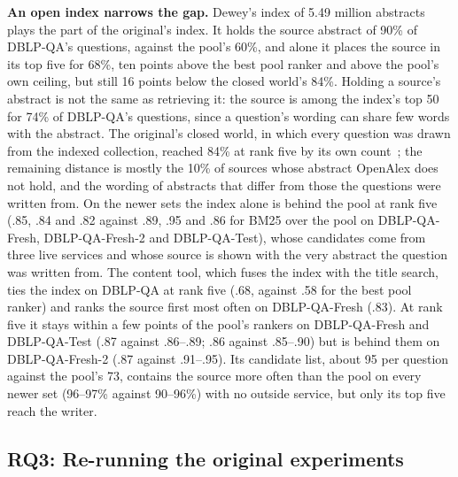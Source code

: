 \documentclass[conference]{IEEEtran}
\newcommand{\dq}{DBLP-QA}
\newcommand{\fresh}{DBLP-QA-Fresh}
\newcommand{\freshb}{DBLP-QA-Fresh-2}
\newcommand{\test}{DBLP-QA-Test}
\begin{document}
\textbf{An open index narrows the gap.} Dewey's index of 5.49 million abstracts plays the part of
the original's index. It holds the source abstract of 90\% of \dq{}'s questions, against the
pool's 60\%, and alone it places the source in its top five for 68\%, ten points above the best pool
ranker and above the pool's own ceiling, but still 16 points below the closed world's 84\%. Holding a source's abstract is not the same as retrieving it:
the source is among the index's top 50 for 74\% of \dq{}'s questions, since a question's wording can
share few words with the abstract. The original's closed world, in which every question was drawn
from the indexed collection, reached 84\% at rank five by its own count~\cite{neekhra2026ragscholar};
the remaining distance is mostly the 10\% of sources whose abstract OpenAlex does not hold, and the
wording of abstracts that differ from those the questions were written from. On the newer sets the index
alone is behind the pool at rank five (.85, .84 and .82 against .89, .95 and .86 for BM25 over the pool on
\fresh{}, \freshb{} and \test{}), whose candidates come from three live services and whose source is shown
with the very abstract the question was written from. The content tool, which fuses the index with the
title search, ties the index on \dq{} at rank five (.68, against .58 for the best pool ranker) and ranks
the source first most often on \fresh{} (.83). At rank five it stays within a few points of the pool's
rankers on \fresh{} and \test{} (.87 against .86--.89; .86 against .85--.90) but is behind them on
\freshb{} (.87 against .91--.95). Its candidate list, about 95 per question against the pool's 73,
contains the source more often than the pool on every newer set (96--97\% against 90--96\%) with no
outside service, but only its top five reach the writer.

\subsection{RQ3: Re-running the original experiments}
\label{sec:rq3}
\end{document}
